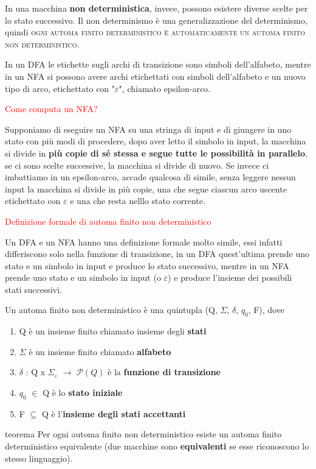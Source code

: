 \documentclass{article}
\begin{document}
In una macchina \textbf{non deterministica}, invece, possono esistere diverse scelte per lo stato successivo. Il non determinismo è una generalizzazione del determinismo, quindi \textsc{ogni automa finito deterministico è automaticamente un automa finito non deterministico}.

In un DFA le etichette sugli archi di transizione sono simboli dell'alfabeto, mentre in un NFA si possono avere archi etichettati con simboli dell'alfabeto e un nuovo tipo di arco, etichettato con "$\varepsilon$", chiamato epsilon-arco.

\noindent \textcolor{red}{Come computa un NFA?}

Supponiamo di eseguire un NFA su una stringa di input e di giungere in uno stato con più modi di procedere, dopo aver letto il simbolo in input, la macchina si divide in \textbf{più copie di sé stessa e segue tutte le possibilità in parallelo}, se ci sono scelte successive, la macchina si divide di nuovo.
Se invece ci imbattiamo in un epsilon-arco, accade qualcosa di simile, senza leggere nessun input la macchina si divide in più copie, una che segue ciascun arco uscente etichettato con $\varepsilon$ e una che resta nelllo stato corrente.

\textcolor{red}{Definizione formale di automa finito non deterministico}

Un DFA e un NFA hanno una definizione formale molto simile, essi infatti differiscono solo nella funzione di transizione, in un DFA quest'ultima prende uno stato e un simbolo in input e produce lo stato successivo, mentre in un NFA prende uno stato e un simbolo in input (o $\varepsilon$) e produce l'insieme dei possibili stati successivi.

Un automa finito non deterministico è una quintupla (Q, $\Sigma$, $\delta$, $q_0$, F), dove
\begin{enumerate}
    \item Q è un insieme finito chiamato insieme degli \textbf{stati}
    \item $\Sigma$ è un insieme finito chiamato \textbf{alfabeto}
    \item $\delta$ : Q x $\Sigma_\varepsilon$ $\rightarrow$ $\mathcal{P}(Q)$ è la \textbf{funzione di transizione}
    \item $q_0$ $\in$ Q è lo \textbf{stato iniziale}
    \item F $\subseteq$ Q è l'\textbf{insieme degli stati accettanti}
\end{enumerate}

\textcolor{green! 50! black}{teorema}
Per ogni automa finito non deterministico esiste un automa finito deterministico equivalente (due macchine sono \textbf{equivalenti} se esse riconoscono lo stesso linguaggio).
\end{document}
